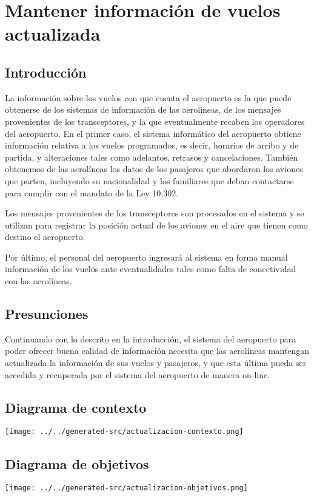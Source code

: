 \section{Mantener información de vuelos actualizada}
\subsection{Introducción}
La información sobre los vuelos con que cuenta el aeropuerto es la que puede  obtenerse de los sistemas de información de las aerolineas, de los mensajes provenientes de los transceptores, y la que eventualmente recaben los operadores del aeropuerto.
En el primer caso, el sistema informático del aeropuerto obtiene información relativa a los vuelos programados, es decir, horarios de arribo y de partida, y alteraciones tales como adelantos, retrasos y cancelaciones. También obtenemos de las aerolíneas los datos de los pasajeros que abordaron los aviones que parten, incluyendo su nacionalidad y los familiares que deban  contactarse para cumplir con el mandato de la Ley 10.302.

Los mensajes provenientes de los transceptores son procesados en el sistema y se utilizan para registrar la posición actual de los aviones en el aire que  tienen como destino el aeropuerto. 

Por último, el personal del aeropuerto ingresará al sistema en forma manual información de los vuelos ante eventualidades tales como falta de conectividad con las aerolíneas.

\subsection{Presunciones}
Continuando con lo descrito en la introducción, el sistema del aeropuerto para poder ofrecer buena calidad de información necesita que las aerolíneas mantengan actualizada la información de sus vuelos y pasajeros, y que esta última pueda ser accedida y recuperada por el sistema del aeropuerto de manera
on-line. 

\subsection{Diagrama de contexto}
\texttt{[image: ../../generated-src/actualizacion-contexto.png]}

\subsection{Diagrama de objetivos}
\texttt{[image: ../../generated-src/actualizacion-objetivos.png]}

